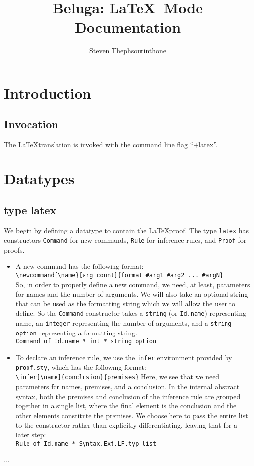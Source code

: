 \documentclass[11pt]{article}
\title{Beluga: \LaTeX\ Mode Documentation}
\author{Steven Thephsourinthone}
\date{} %
\begin{document}
\maketitle

\section{Introduction}
\subsection{Invocation}
The \LaTeX translation is invoked with the command line flag ``+latex''.
\section{Datatypes}
\subsection{type latex}
We begin by defining a datatype to contain the \LaTeX proof. The type \verb+latex+ has constructors \verb+Command+ for new commands, \verb+Rule+ for inference rules, and \verb+Proof+ for proofs.
\begin{itemize}
\item A new command has the following format:\\
\verb+\newcommand{\name}[arg count]{format #arg1 #arg2 ... #argN}+\\
So, in order to properly define a new command, we need, at least, parameters for names and the number of arguments. We will also take an optional string that can be used as the formatting string which we will allow the user to define. So the \verb+Command+ constructor takes a \verb+string+ (or \verb+Id.name+) representing name, an \verb+integer+ representing the number of arguments, and a \verb+string option+ representing a formatting string:\\ \verb+Command of Id.name * int * string option+
\item To declare an inference rule, we use the \verb+infer+ environment provided by \verb+proof.sty+, which has the following format:\\
\verb+\infer[\name]{conclusion}{premises}+
Here, we see that we need parameters for names, premises, and a conclusion. In the internal abstract syntax, both the premises and conclusion of the inference rule are grouped together in a single list, where the final element is the conclusion and the other elements constitute the premises. We choose here to pass the entire list to the constructor rather than explicitly differentiating, leaving that for a later step:\\ \verb+Rule of Id.name * Syntax.Ext.LF.typ list+
\end{itemize}
...
\end{document}
